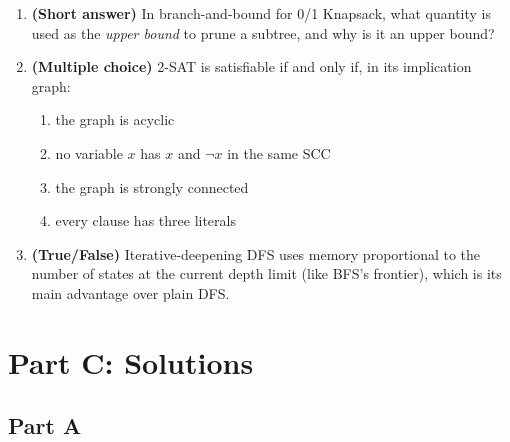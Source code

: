 \documentclass[11pt]{article}
\begin{document}
\begin{enumerate}[label=\textbf{B\arabic*.}, leftmargin=2.2em]
\item \textbf{(Short answer)} In branch-and-bound for 0/1 Knapsack, what
quantity is used as the \emph{upper bound} to prune a subtree, and why is it an
upper bound?

\item \textbf{(Multiple choice)} 2-SAT is satisfiable if and only if, in its
implication graph:
\begin{enumerate}[label=(\alph*)]
    \item the graph is acyclic
    \item no variable $x$ has $x$ and $\lnot x$ in the same SCC
    \item the graph is strongly connected
    \item every clause has three literals
\end{enumerate}

\item \textbf{(True/False)} Iterative-deepening DFS uses memory proportional to
the number of states at the current depth limit (like BFS's frontier), which is
its main advantage over plain DFS.

\end{enumerate}

\newpage
\section*{Part C: Solutions}

\subsection*{Part A}
\end{document}
